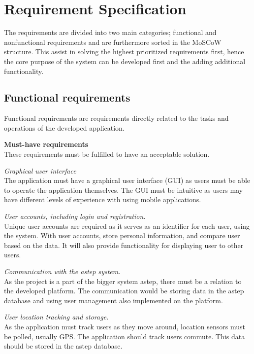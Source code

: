 \section{Requirement Specification}\label{sec:req}
The requirements are divided into two main categories; functional and nonfunctional requirements and are furthermore sorted in the MoSCoW \cite{moscow} structure.
This assist in solving the highest prioritized requirements first, hence the core purpose of the system can be developed first and the adding additional functionality.


\subsection{Functional requirements}
Functional requirements are requirements directly related to the tasks and operations of the developed application.

\textbf{Must-have requirements}\\
These requirements must be fulfilled to have an acceptable solution.

\textit{Graphical user interface}\\
The application must have a graphical user interface (GUI) as users must be able to operate the application themselves. 
The GUI must be intuitive as users may have different levels of experience with using mobile applications.

\textit{User accounts, including login and registration.}\\
Unique user accounts are required as it serves as an identifier for each user, using the system. 
With user accounts, store personal information, and compare user based on the data. 
It will also provide functionality for displaying user to other users.

\textit{Communication with the \gls{astep} system.}\\
As the project is a part of the bigger system \gls{astep}, there must be a relation to the developed platform. 
The communication would be storing data in the \gls{astep} database and using user management also implemented on the platform.

\textit{User location tracking and storage.}\\
As the application must track users as they move around, location sensors must be polled, usually GPS. 
The application should track users commute.
This data should be stored in the \gls{astep} database.

